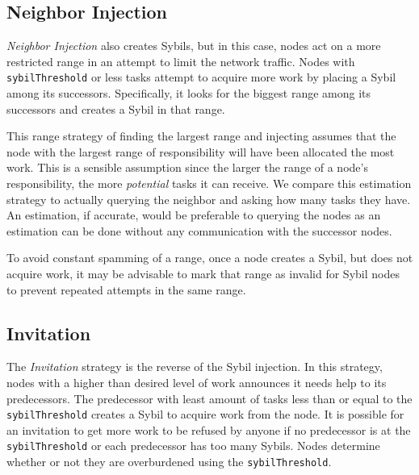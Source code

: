 \documentclass[11pt,conference]{IEEEtran}
\begin{document}



\subsection{Neighbor Injection}
\label{sec:strat-neighbor}
\textit{Neighbor Injection} also creates Sybils, but in this case, nodes act on a more restricted range in an attempt to limit the network traffic.
Nodes with \texttt{sybilThreshold} or less tasks attempt to acquire more work by placing a Sybil among its successors.
Specifically, it looks for the biggest range among its successors and creates a Sybil in that range.

This range strategy of finding the largest range and injecting assumes that the node with the largest range of responsibility will have been allocated the most work.
This is a sensible assumption since the larger the range of a node's responsibility, the more \textit{potential} tasks it can receive. 
We compare this estimation strategy to actually querying the neighbor and asking how many tasks they have.
An estimation, if accurate, would be preferable to querying the nodes as an estimation can be done without any communication with the successor nodes.

To avoid constant spamming of a range, once a node creates a Sybil, but does not acquire work, it may be advisable to mark that range as invalid for Sybil nodes to prevent repeated attempts in the same range. 


\subsection{Invitation}
The \textit{Invitation} strategy is the reverse of the Sybil injection.
In  this strategy, nodes with a higher than desired level of work announces it needs help to its predecessors.
The predecessor with least amount of tasks less than or equal to the \texttt{sybilThreshold} creates a Sybil to acquire work from the node.
It is possible for an invitation to get more work to be refused by anyone if no  predecessor is at the \texttt{sybilThreshold} or each predecessor has too many Sybils.
Nodes determine whether or not they are overburdened using the \texttt{sybilThreshold}.
\end{document}
